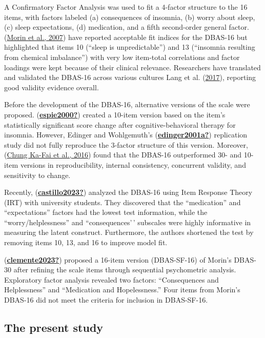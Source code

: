 \documentclass[
  ,doc,11pt, twoside,floatsintext]{apa6}
\begin{document}
A Confirmatory Factor Analysis was used to fit a 4-factor structure to the 16 items, with factors labeled (a) consequences of insomnia, (b) worry about sleep, (c) sleep expectations, (d) medication, and a fifth second-order general factor. (\protect\hyperlink{ref-morin2007a}{Morin et al., 2007}) have reported acceptable fit indices for the DBAS-16 but highlighted that items 10 (``sleep is unpredictable'') and 13 (``insomnia resulting from chemical imbalance'') with very low item-total correlations and factor loadings were kept because of their clinical relevance. Researchers have translated and validated the DBAS-16 across various cultures Lang et al. (\protect\hyperlink{ref-lang2017}{2017}), reporting good validity evidence overall.

Before the development of the DBAS-16, alternative versions of the scale were proposed. (\protect\hyperlink{ref-espie2000}{\textbf{espie2000?}}) created a 10-item version based on the item's statistically significant score change after cognitive-behavioral therapy for insomnia. However, Edinger and Wohlgemuth's (\protect\hyperlink{ref-edinger2001a}{\textbf{edinger2001a?}}) replication study did not fully reproduce the 3-factor structure of this version. Moreover, (\protect\hyperlink{ref-chungka-fai2016}{Chung Ka-Fai et al., 2016}) found that the DBAS-16 outperformed 30- and 10-item versions in reproducibility, internal consistency, concurrent validity, and sensitivity to change.

Recently, (\protect\hyperlink{ref-castillo2023}{\textbf{castillo2023?}}) analyzed the DBAS-16 using Item Response Theory (IRT) with university students. They discovered that the ``medication'' and ``expectations'' factors had the lowest test information, while the ``worry/helplessness'' and ``consequences'\,' subscales were highly informative in measuring the latent construct. Furthermore, the authors shortened the test by removing items 10, 13, and 16 to improve model fit.

(\protect\hyperlink{ref-clemente2023}{\textbf{clemente2023?}}) proposed a 16-item version (DBAS-SF-16) of Morin's DBAS-30 after refining the scale items through sequential psychometric analysis. Exploratory factor analysis revealed two factors: ``Consequences and Helplessness'' and ``Medication and Hopelessness.'' Four items from Morin's DBAS-16 did not meet the criteria for inclusion in DBAS-SF-16.

\hypertarget{the-present-study}{%
\subsection{The present study}\label{the-present-study}}
\end{document}
